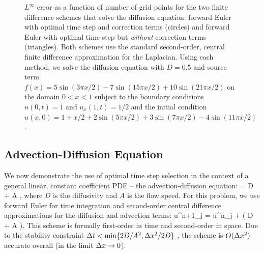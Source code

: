\documentclass[oneeqnum,onefignum,onetabnum,onethmnum]{siamltex}
\begin{document}
\begin{figure}[htb]
\begin{center}
\caption{$L^\infty$ error as a function of number of grid points for the 
two finite difference schemes that solve the diffusion equation: 
forward Euler with optimal time step and correction terms (circles) and 
forward Euler with optimal time step but \emph{without} correction terms 
(triangles).  Both schemes use the standard second-order, central finite 
difference approximation for the Laplacian.
Using each method, we solve the diffusion equation with $D = 0.5$ and
source term 
$f(x) = 5 \sin(3 \pi x/2) - 7 \sin(15 \pi x/2) + 10 \sin(21 \pi x/2)$
on the domain $0 < x < 1$ subject to the boundary conditions 
$u(0,t) = 1$ and $u_x(1,t) = 1/2$ 
and the initial condition
$u(x,0) = 1 + x/2 + 2 \sin(5 \pi x/2) + 3 \sin(7 \pi x/2) 
- 4 \sin(11 \pi x/2)$.  
}
\label{fig:diffusion_eqn_1d_src_error}
\end{center}
\end{figure}


\subsection{Advection-Diffusion Equation}
We now demonstrate the use of optimal time step selection in the context of 
a general linear, constant coefficient PDE -- the advection-diffusion 
equation:
\beq
   = D  
  + A ,
  \label{eq:ADE_1d}
\eeq
where $D$ is the diffusivity and $A$ is the flow speed.  For this problem,
we use forward Euler for time integration and second-order central 
difference approximations for the diffusion and advection terms:
\beq
  u^{n+1}_j = u^{n}_j 
  + \dt 
    \left( D  
         + A  \right).
  \label{eq:ADE_1d_FD_scheme}
\eeq
This scheme is formally first-order in time and second-order in space.  
Due to the stability constraint $\Delta t < \min \{2D/A^2, \Delta x^2/2D \}$ 
\cite{chan_1984}, the scheme is $O(\Delta x^2)$ accurate overall (in the limit 
$\Delta x \rightarrow 0$).
\end{document}
